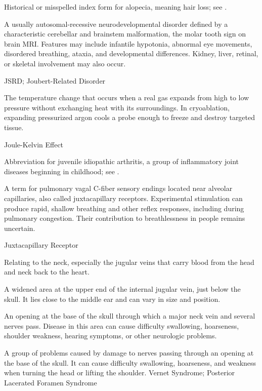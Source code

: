  Historical or misspelled index form for alopecia, meaning hair loss; see .

 A usually autosomal-recessive neurodevelopmental disorder defined by a characteristic cerebellar and brainstem malformation, the molar tooth sign on brain MRI.
Features may include infantile hypotonia, abnormal eye movements, disordered breathing, ataxia, and developmental differences.
Kidney, liver, retinal, or skeletal involvement may also occur.

\synonyms
JSRD; Joubert-Related Disorder

 The temperature change that occurs when a real gas expands from high to low pressure without exchanging heat with its surroundings. In cryoablation, expanding pressurized argon cools a probe enough to freeze and destroy targeted tissue.

\synonyms
Joule-Kelvin Effect

 Abbreviation for juvenile idiopathic arthritis, a group of inflammatory joint diseases beginning in childhood; see .

 A term for pulmonary vagal C-fiber sensory endings located near
alveolar capillaries, also called juxtacapillary receptors. Experimental stimulation can
produce rapid, shallow breathing and other reflex responses, including during pulmonary
congestion. Their contribution to breathlessness in people remains uncertain.

\synonyms
Juxtacapillary Receptor

 Relating to the neck, especially the jugular veins that carry blood from the head and neck back to the heart.

 A widened area at the upper end of the internal jugular vein, just below the skull. It lies close to the middle ear and can vary in size and position.

 An opening at the base of the skull through which a major neck vein and several nerves pass. Disease in this area can cause difficulty swallowing, hoarseness, shoulder weakness, hearing symptoms, or other neurologic problems.

 A group of problems caused by damage to nerves passing through an opening at the base of the skull. It can cause difficulty swallowing, hoarseness, and weakness when turning the head or lifting the shoulder.
\synonyms
Vernet Syndrome; Posterior Lacerated Foramen Syndrome

